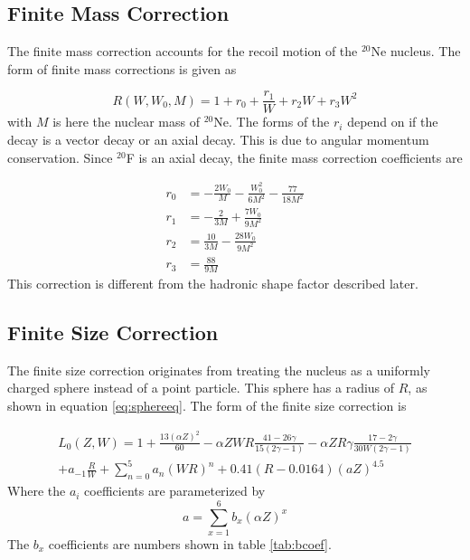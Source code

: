 \documentclass[../MaxHughesThesis.tex]{subfiles}
\begin{document}
\subsection{Finite Mass Correction}
The finite mass correction accounts for the recoil motion of the $^{20}$Ne nucleus.
The form of finite mass corrections is given as \cite{WIL90} %

\begin{equation}
	R(W,W_{0},M) = 1 + r_{0} + \frac{r_{1}}{W} + r_{2}W + r_{3}W^{2}
	\label{eq:finitemass}
\end{equation}
with $M$ is here the nuclear mass of $^{20}$Ne.
The forms of the $r_{i}$ depend on if the decay is a vector decay or an axial decay. 
This is due to angular momentum conservation.
Since $^{20}$F is an axial decay, the finite mass correction coefficients are %

\begin{equation}
	\label{eq:finitemassrs}
	\begin{split}
	r_{0} & = -\frac{2W_{0}}{M} - \frac{W_{0}^{2}}{6M^{2}} - \frac{77}{18M^{2}} \\
	r_{1} & = -\frac{2}{3M} + \frac{7W_{0}}{9M^{2}} \\
	r_{2} & = \frac{10}{3M} - \frac{28W_{0}}{9M^{2}} \\
	r_{3} & = \frac{88}{9M}
	\end{split}
\end{equation}
This correction is different from the hadronic shape factor described later. 

\subsection{Finite Size Correction}
The finite size correction originates from treating the nucleus as a uniformly charged sphere instead of a point particle.
This sphere has a radius of $R$, as shown in equation \ref{eq:sphereeq}.
The form of the finite size correction is \cite{WIL90} %

\begin{equation}
	\label{eq:finitesize}
	\begin{split}
	L_{0}(Z,W) = 1 + \frac{13(\alpha Z)^{2}}{60} - \alpha Z W R \frac{41 - 26\gamma}{15(2\gamma - 1)} - \alpha Z R \gamma \frac{17 - 2\gamma}{30W(2\gamma - 1)}  \\
	+ a_{-1} \frac{R}{W} + \sum_{n=0}^{5} a_{n} (W R)^{n} + 0.41(R - 0.0164)(a Z)^{4.5}
	\end{split}
\end{equation}
Where the $a_{i}$ coefficients are parameterized by %
\begin{equation}
	a = \sum_{x = 1}^{6} b_{x} (\alpha Z)^{x}
	\label{eq:A}
\end{equation}
The $b_{x}$ coefficients are numbers shown in table \ref{tab:bcoef}.
\end{document}

